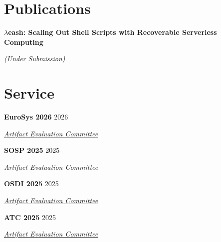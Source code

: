 \documentclass[margin,11pt]{resume}
\newcommand{\cvName}{Nikos Pagonas}
\newcommand{\subsectionVSpace}{\vspace{3.5ex}\xspace}
\newcommand{\sectionVSpace}{\vspace{1ex}\xspace} %
\newcommand{\sectionVSpaceCorrection}{\vspace{-3.5ex}} %
\newcommand{\header}[1]{\textbf{#1}\xspace}
\newcommand{\authors}[1]{#1\xspace}
\newcommand{\equalContributionNote}{(*equal contribution)\xspace}
\newcommand{\me}{\cvName\xspace}
\newcommand{\ordinal}[1]{\textsuperscript{#1}\xspace}
\newcommand{\paperTitle}[1]{\header{#1}\xspace}
\newcommand{\role}[1]{\textit{#1}\xspace}
\newcommand{\service}[1]{\header{#1}\xspace}
\newcommand{\underSubmission}{\textit{(Under Submission)}\xspace}
\newcommand{\venue}[1]{\textit{#1}\xspace}
\newenvironment{rSubsection}{}{\par\subsectionVSpace}
\newenvironment{rSection}[1]{\sectionVSpaceCorrection\section{#1}\xspace}{\sectionVSpace\par}
\begin{document}
\begin{resume}
\begin{rSection}{Publications}
\begin{rSubsection}
		\end{rSubsection}

		\begin{rSubsection}
			\paperTitle{\( \lambda \)eash: Scaling Out Shell Scripts with Recoverable Serverless Computing}

			\underSubmission


		\end{rSubsection}




	\end{rSection}

	\begin{rSection}{Service}
		\begin{rSubsection}
			\service{EuroSys 2026} \hfill 2026

			\role{\href{https://sysartifacts.github.io/eurosys2026/organizers}{Artifact Evaluation Committee}}
		\end{rSubsection}

		\begin{rSubsection}
			\service{SOSP 2025} \hfill 2025

			\role{Artifact Evaluation Committee}
		\end{rSubsection}

		\begin{rSubsection}
			\service{OSDI 2025} \hfill 2025

			\role{\href{https://www.usenix.org/conference/atc25}{Artifact Evaluation Committee}}
		\end{rSubsection}

		\begin{rSubsection}
			\service{ATC 2025} \hfill 2025

			\role{\href{https://www.usenix.org/conference/osdi25}{Artifact Evaluation Committee}}
		\end{rSubsection}


\end{rSection}
\end{resume}
\end{document}
